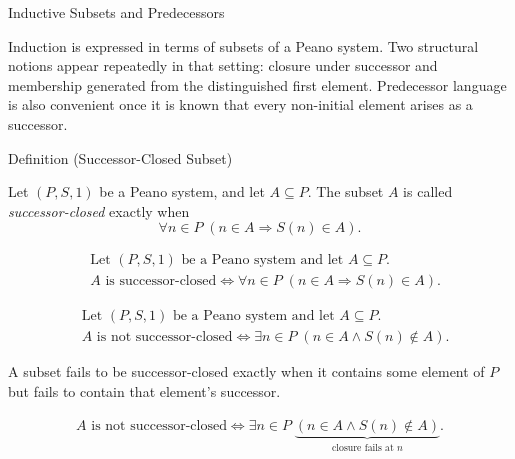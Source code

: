 \begin{topicbox}{Inductive Subsets and Predecessors}
\begin{exposition}
Induction is expressed in terms of subsets of a Peano system. Two structural
notions appear repeatedly in that setting: closure under successor and
membership generated from the distinguished first element. Predecessor language
is also convenient once it is known that every non-initial element arises as a
successor.
\end{exposition}

\begin{definitionbox}{Definition (Successor-Closed Subset)}
\begin{definition}
\label{def:successor-closed-subset}
Let $(P,S,1)$ be a Peano system, and let $A \subseteq P$. The subset $A$ is
called \emph{successor-closed} exactly when
\[
\forall n \in P\;(n \in A \Longrightarrow S(n) \in A).
\]
\end{definition}
\end{definitionbox}

\begin{remark*}
\[
\begin{aligned}
&\text{Let } (P,S,1) \text{ be a Peano system and let } A \subseteq P.\\
&A \text{ is successor-closed}
\Longleftrightarrow
\forall n \in P\;(n \in A \Longrightarrow S(n) \in A).
\end{aligned}
\]
\end{remark*}

\begin{remark*}
\[
\begin{aligned}
&\text{Let } (P,S,1) \text{ be a Peano system and let } A \subseteq P.\\
&A \text{ is not successor-closed}
\Longleftrightarrow
\exists n \in P\;(n \in A \land S(n) \notin A).
\end{aligned}
\]
\end{remark*}

\begin{remark*}
A subset fails to be successor-closed exactly when it contains some element of
$P$ but fails to contain that element's successor.
\end{remark*}

\begin{remark*}
\[
\begin{aligned}
A \text{ is not successor-closed}
\Longleftrightarrow
\exists n \in P\;\underbrace{(n \in A \land S(n) \notin A)}_{\text{closure fails at } n}.
\end{aligned}
\]
\end{remark*}


\end{topicbox}
